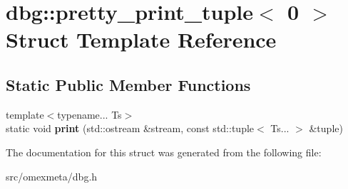 \hypertarget{structdbg_1_1pretty__print__tuple_3_010_01_4}{}\section{dbg\+:\+:pretty\+\_\+print\+\_\+tuple$<$ 0 $>$ Struct Template Reference}
\label{structdbg_1_1pretty__print__tuple_3_010_01_4}
\subsection*{Static Public Member Functions}
\begin{DoxyCompactItemize}
\item 
\mbox{\label{structdbg_1_1pretty__print__tuple_3_010_01_4_a9961147d35a3bcc6b89af9610c68ad39}} 
{\footnotesize template$<$typename... Ts$>$ }\\static void {\bfseries print} (std\+::ostream \&stream, const std\+::tuple$<$ Ts... $>$ \&tuple)
\end{DoxyCompactItemize}


The documentation for this struct was generated from the following file\+:\begin{DoxyCompactItemize}
\item 
src/omexmeta/dbg.\+h\end{DoxyCompactItemize}
